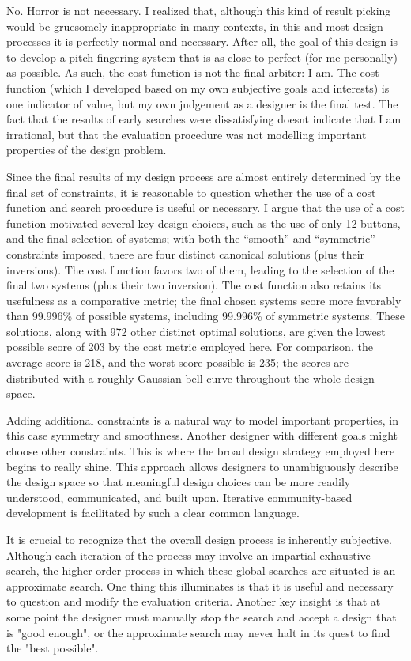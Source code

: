 \documentclass[sigconf]{nimeart}
\begin{document}
No. Horror is not necessary. I realized that, although this kind of result picking would be gruesomely inappropriate in many contexts, in this and most design processes it is perfectly normal and necessary. After all, the goal of this design is to develop a pitch fingering system that is as close to perfect (for me personally) as possible. As such, the cost function is not the final arbiter: I am. The cost function (which I developed based on my own subjective goals and interests) is one indicator of value, but my own judgement as a designer is the final test. The fact that the results of early searches were dissatisfying doesn\textquotesingle t indicate that I am irrational, but that the evaluation procedure was not modelling important properties of the design problem.

Since the final results of my design process are almost entirely determined by the final set of constraints, it is reasonable to question whether the use of a cost function and search procedure is useful or necessary. I argue that the use of a cost function motivated several key design choices, such as the use of only 12 buttons, and the final selection of systems; with both the ``smooth'' and ``symmetric'' constraints imposed, there are four distinct canonical solutions (plus their inversions). The cost function favors two of them, leading to the selection of the final two systems (plus their two inversion). The cost function also retains its usefulness as a comparative metric; the final chosen systems score more favorably than 99.996\% of possible systems, including 99.996\% of symmetric systems. These solutions, along with 972 other distinct optimal solutions, are given the lowest possible score of 203 by the cost metric employed here. For comparison, the average score is 218, and the worst score possible is 235; the scores are distributed with a roughly Gaussian bell-curve throughout the whole design space.

Adding additional constraints is a natural way to model important properties, in this case symmetry and smoothness. Another designer with different goals might choose other constraints. This is where the broad design strategy employed here begins to really shine. This approach allows designers to unambiguously describe the design space so that meaningful design choices can be more readily understood, communicated, and built upon. Iterative community-based development is facilitated by such a clear common language.

It is crucial to recognize that the overall design process is inherently subjective. Although each iteration of the process may involve an impartial exhaustive search, the higher order process in which these global searches are situated is an approximate search. One thing this illuminates is that it is useful and necessary to question and modify the evaluation criteria. Another key insight is that at some point the designer must manually stop the search and accept a design that is "good enough", or the approximate search may never halt in its quest to find the "best possible".
\end{document}
